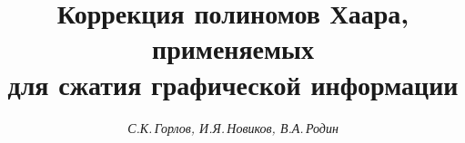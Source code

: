 

 


  


\newcommand{\mes}{\operatorname{mes}} 


\newcommand{\supp}{\operatorname{supp}} 


\newcommand{\tts}[1]{} 


 




 


\setcounter{page}{6} 












 


\author{\it С.К.\,Горлов, И.Я.\,Новиков, В.А.\,Родин} 




\title{Коррекция полиномов Хаара, применяемых\\


для сжатия графической информации} 


 


\date{} 




\pagestyle{plain} %


 




\maketitle 


